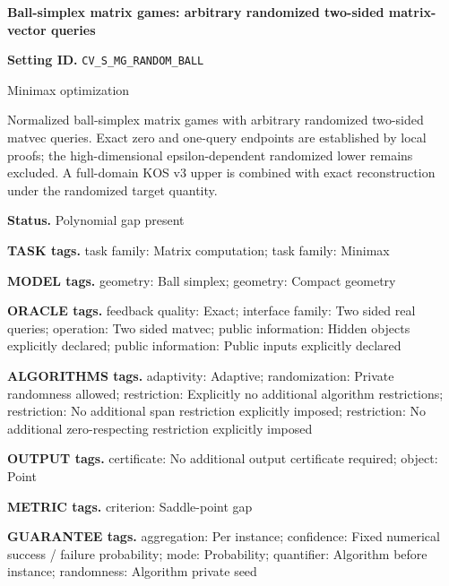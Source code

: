\documentclass[10pt,a4paper]{article}
\begin{document}
\raggedright

{\LARGE\bfseries\sffamily\color{AtlasNavy} Ball-simplex matrix games: arbitrary randomized two-sided matrix-vector queries\par}\vspace{5pt}


\textbf{Setting ID.} \texttt{CV\_\allowbreak{}S\_\allowbreak{}MG\_\allowbreak{}RANDOM\_\allowbreak{}BALL}



Minimax optimization



Normalized ball-simplex matrix games with arbitrary randomized two-sided matvec queries. Exact zero and one-query endpoints are established by local proofs; the high-dimensional epsilon-dependent randomized lower remains excluded. A full-domain KOS v3 upper is combined with exact reconstruction under the randomized target quantity.



\textbf{Status.} Polynomial gap present



\textbf{TASK tags.} task family: Matrix computation; task family: Minimax



\textbf{MODEL tags.} geometry: Ball simplex; geometry: Compact geometry



\textbf{ORACLE tags.} feedback quality: Exact; interface family: Two sided real queries; operation: Two sided matvec; public information: Hidden objects explicitly declared; public information: Public inputs explicitly declared



\textbf{ALGORITHMS tags.} adaptivity: Adaptive; randomization: Private randomness allowed; restriction: Explicitly no additional algorithm restrictions; restriction: No additional span restriction explicitly imposed; restriction: No additional zero-respecting restriction explicitly imposed



\textbf{OUTPUT tags.} certificate: No additional output certificate required; object: Point



\textbf{METRIC tags.} criterion: Saddle-point gap



\textbf{GUARANTEE tags.} aggregation: Per instance; confidence: Fixed numerical success / failure probability; mode: Probability; quantifier: Algorithm before instance; randomness: Algorithm private seed
\end{document}
